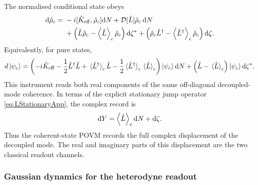 \documentclass{article}
\numberwithin{equation}{section}
\begin{document}
	The normalised conditional state obeys
	\begin{align}
		\dd\hat\rho_c ={}& -i[\hat K_{\rm eff},\hat\rho_c]\dd N + \mathcal D[\hat L]\hat\rho_c\,\dd N \nonumber\\ &+ \left( \hat L\hat\rho_c - \ev{\hat L}_c\hat\rho_c \right)\dd \zeta^* + \left( \hat\rho_c\hat L^\dagger - \ev{\hat L^\dagger}_c\hat\rho_c \right)\dd \zeta .
		\label{eq:HeterodyneSMEPOVMApp}
	\end{align}
	Equivalently, for pure states,
	\begin{equation}
		d\ket{\psi_c} = \left( -i\hat K_{\rm eff} -\frac12\hat L^\dagger\hat L +\ev*{\hat L^\dagger}_c\hat L -\frac12\ev*{\hat L^\dagger}_c\ev*{\hat L}_c \right)\ket{\psi_c}\dd N + \left( \hat L-\ev*{\hat L}_c \right)\ket{\psi_c}\dd \zeta^* .
		\label{eq:heterodyneSSEshort}
	\end{equation}
	This instrument reads both real components of the same off-diagonal decoupled-mode coherence. In terms of the explicit stationary jump operator \cref{eq:LStationaryApp}, the complex record is
	\begin{equation}
		\dd Y = \ev{\hat L}_c \dd N+\dd \zeta .
		\label{eq:HeterodyneComplexRecordCompactApp}
	\end{equation}
	Thus the coherent-state POVM records the full complex displacement of the decoupled mode. The real and imaginary parts of this displacement are the two classical readout channels.

	\subsubsection{Gaussian dynamics for the heterodyne readout}
	\label{app:Gaussian}
\end{document}
